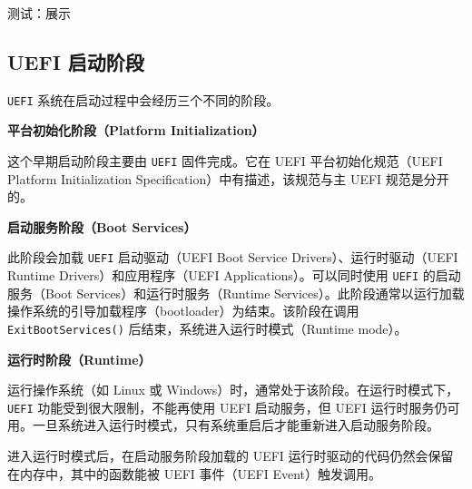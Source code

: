 测试：展示

\subsection{UEFI 启动阶段}

\texttt{UEFI} 系统在启动过程中会经历三个不同的阶段。

\textbf{平台初始化阶段（Platform Initialization）}

这个早期启动阶段主要由 \texttt{UEFI} 固件完成。它在 UEFI 平台初始化规范（UEFI Platform Initialization Specification）中有描述，该规范与主 UEFI 规范是分开的。

\textbf{启动服务阶段（Boot Services）}

此阶段会加载 \texttt{UEFI} 启动驱动（UEFI Boot Service Drivers）、运行时驱动（UEFI Runtime Drivers）和应用程序（UEFI Applications）。可以同时使用 \texttt{UEFI} 的启动服务（Boot Services）和运行时服务（Runtime Services）。此阶段通常以运行加载操作系统的引导加载程序（bootloader）为结束。该阶段在调用 \texttt{ExitBootServices()} 后结束，系统进入运行时模式（Runtime mode）。

\textbf{运行时阶段（Runtime）}

运行操作系统（如 Linux 或 Windows）时，通常处于该阶段。在运行时模式下，\texttt{UEFI} 功能受到很大限制，不能再使用 UEFI 启动服务，但 UEFI 运行时服务仍可用。一旦系统进入运行时模式，只有系统重启后才能重新进入启动服务阶段。

进入运行时模式后，在启动服务阶段加载的 UEFI 运行时驱动的代码仍然会保留在内存中，其中的函数能被 UEFI 事件（UEFI Event）触发调用。